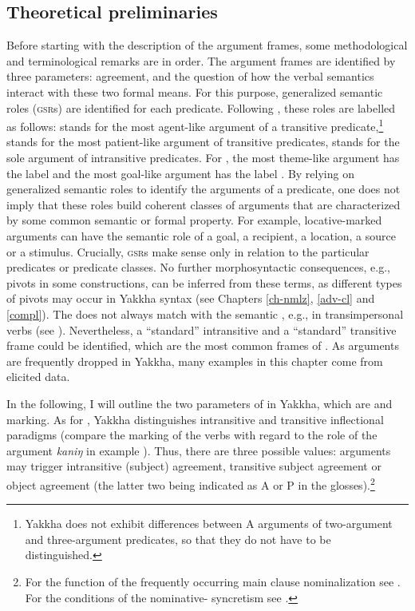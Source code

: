 \subsection{Theoretical preliminaries}

Before starting with the description of the argument frames, some methodological and terminological remarks are in order. The argument frames are identified by three parameters:  agreement,   and the question of how the verbal semantics interact with these two formal means. For this purpose, generalized semantic roles (\textsc{gsr}s) are identified for each predicate. Following \citet{Bickel2010_Grammatical}, these roles are labelled as follows:  stands for the most agent-like argument of a transitive predicate,\footnote{Yakkha does not exhibit differences between A arguments of two-argument and three-argument predicates, so that they do not have to be distinguished.}  stands for the most patient-like argument of transitive predicates,  stands for the sole argument of intransitive predicates. For , the most theme-like argument has the label  and the most goal-like argument has the label .  By relying on generalized semantic roles to identify the arguments of a predicate, one does not imply that these roles build coherent  classes of arguments that are characterized by some common semantic or formal property. For example, locative-marked arguments can have the semantic role of a goal, a recipient, a location, a source or a stimulus. Crucially, \textsc{gsr}s make sense only in relation to the particular predicates or predicate classes. No further morphosyntactic consequences, e.g., pivots in some constructions, can be inferred from these terms, as different types of pivots may occur in Yakkha syntax (see Chapters \ref{ch-nmlz}, \ref{adv-cl} and \ref{compl}). The  does not always match with the semantic , e.g., in transimpersonal verbs (see ). Nevertheless, a “standard” intransitive and a “standard” transitive frame could be identified, which are the most common frames of . As arguments are frequently dropped in Yakkha, many examples in this chapter come from elicited data.

In the following, I will outline the two parameters of  in Yakkha, which are  and  marking. 
As for , Yakkha distinguishes intransitive and transitive inflectional paradigms (compare the marking of the verbs with regard to the role of the  argument \emph{kaniŋ} in example \Next). Thus, there are three possible values: arguments may trigger intransitive (subject) agreement, transitive subject agreement or object agreement (the latter two being indicated as A or P in the glosses).\footnote{For the function of the frequently occurring main clause nominalization see . For the conditions of the nominative- syncretism see .} 

